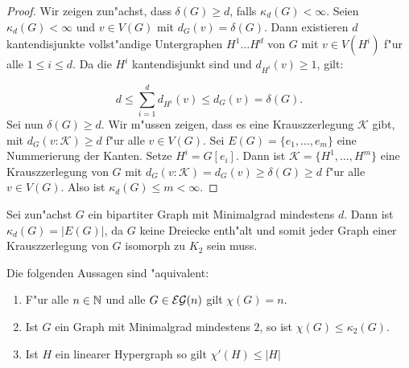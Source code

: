 \begin{proof}
  Wir zeigen zun"achst, dass $\delta(G) \geq d$, falls $\kappa_d(G) < \infty$. Seien $\kappa_d(G) <\infty$ und $v\in V(G)$ mit $d_{G}(v) = \delta(G)$. Dann existieren $d$ kantendisjunkte vollst"andige Untergraphen $H^{1}\dots H^{d}$ von $G$ mit $v\in V(H^{i})$ f"ur alle $1\leq i \leq d$. Da die $H^{i}$ kantendisjunkt sind und $d_{H^{i}}(v)\geq1$, gilt: 

  \[
    d \leq \sum\limits_{i=1}^{d} d_{H^{i}}(v) \leq d_G(v) = \delta(G). 
  \]
  Sei nun $\delta(G) \geq d$. Wir m"ussen zeigen, dass es eine Krauszzerlegung $\mathcal{K}$ gibt, mit $d_{G}(v:\mathcal{K}) \geq d$ f"ur alle $v\in V(G)$. Sei $E(G)= \{e_1,\dots, e_{m}\}$ eine Nummerierung der Kanten. Setze $H^{i}= G[e_i]$. Dann ist $\mathcal{K} = \{H^{1},\dots, H^{m}\}$ eine Krauszzerlegung von $G$ mit $d_{G}(v:\mathcal{K}) = d_{G}(v) \geq \delta(G) \geq d$ f"ur alle $v\in V(G)$. Also ist $\kappa_d(G)\leq m <\infty$.

\end{proof}

\begin{example}
  Sei zun"achst $G$ ein bipartiter Graph mit Minimalgrad mindestens $d$. Dann ist $\kappa_{d}(G) = |E(G)|$, da $G$ keine Dreiecke enth"alt und somit jeder Graph einer Krauszzerlegung von $G$ isomorph zu $K_{2}$ sein muss. 
\end{example}

\begin{theorem}
  Die folgenden Aussagen sind "aquivalent:
  \begin{enumerate}[label=(\alph*)]
    \item F"ur alle $n\in{\mathbb{N}}$ und alle $G\in{\cal EG}(n)$ gilt $\chi(G) = n$.
    \item Ist $G$ ein Graph mit Minimalgrad mindestens $2$, so ist $\chi(G) \leq \kappa_{2}(G)$.
    \item Ist $H$ ein linearer Hypergraph so gilt $\chi'(H)\leq |H|$
  \end{enumerate}
  \label{thm:equivefl}
\end{theorem}

